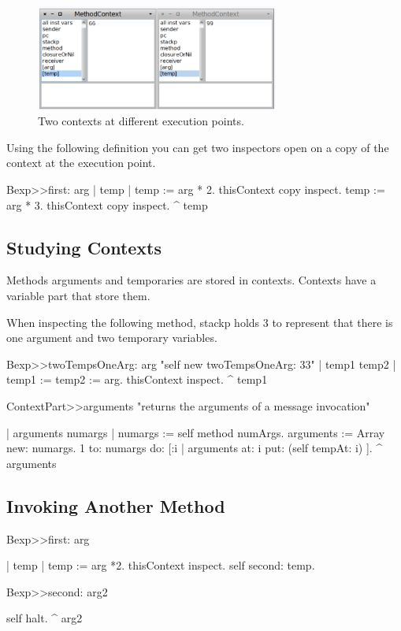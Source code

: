 \documentclass[a4paper,10pt,twoside]{book}
\begin{document}
\begin{figure}[!h]
\begin{center}\includegraphics[width=8cm]{TwoContexts}
\caption{Two contexts at different execution points.\label{ByteCodes}}
\end{center}
\end{figure}

Using the following definition you can get two inspectors open on a copy of the context
at the execution point.
\begin{code}
Bexp>>first: arg
	| temp |
	temp := arg * 2.
	thisContext copy inspect.
	temp := arg * 3.
	thisContext copy inspect.
	^ temp
\end{code}

\subsection{Studying Contexts}
Methods arguments and temporaries are stored in contexts. Contexts have a variable part that
store them.

When inspecting the following method, stackp holds 3 to represent that there is one argument
and two temporary variables.

\begin{code}{}
Bexp>>twoTempsOneArg: arg
	"self new twoTempsOneArg: 33"
	| temp1 temp2 |
	temp1 := temp2 := arg.
	thisContext inspect.
	^ temp1
\end{code}


\begin{code}{}
ContextPart>>arguments
	"returns the arguments of a message invocation"

	| arguments numargs |
	numargs :=  self method numArgs.
	arguments := Array new: numargs.
	1 to: numargs do: [:i | arguments at: i put: (self tempAt: i) ].
	^ arguments
\end{code}






\subsection{Invoking Another Method}
\begin{code}{}
Bexp>>first: arg

	| temp |
	temp := arg *2.
	thisContext inspect.
	self second: temp.

Bexp>>second: arg2

	self halt.
	^ arg2
\end{code}
\end{document}
